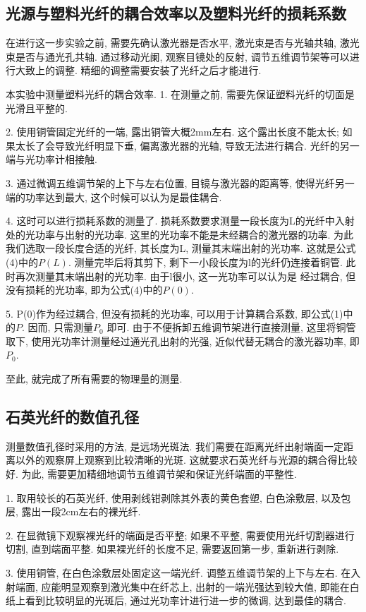 \documentclass[12pt,a4paper]{article}
\begin{document}
\subsection{光源与塑料光纤的耦合效率以及塑料光纤的损耗系数}
在进行这一步实验之前, 需要先确认激光器是否水平, 激光束是否与光轴共轴, 激光束是否与通光孔共轴. 
通过移动光阑, 观察目镜处的反射, 调节五维调节架等可以进行大致上的调整. 精细的调整需要安装了光纤之后才能进行.

本实验中测量塑料光纤的耦合效率. 
1. 在测量之前, 需要先保证塑料光纤的切面是光滑且平整的. 

2. 使用铜管固定光纤的一端, 露出铜管大概2mm左右. 这个露出长度不能太长; 如果太长了会导致光纤明显下垂, 偏离激光器的光轴, 导致无法进行耦合.
光纤的另一端与光功率计相接触.

3. 通过微调五维调节架的上下与左右位置, 目镜与激光器的距离等, 使得光纤另一端的功率达到最大, 这个时候可以认为是最佳耦合.

4. 这时可以进行损耗系数的测量了. 损耗系数要求测量一段长度为L的光纤中入射处的光功率与出射的光功率. 这里的光功率不能是未经耦合的激光器的功率. 
为此我们选取一段长度合适的光纤, 其长度为L, 测量其末端出射的光功率. 这就是公式(4)中的$P(L)$. 测量完毕后将其剪下, 剩下一小段长度为l的光纤仍连接着铜管. 此时再次测量其末端出射的光功率. 由于l很小, 这一光功率可以认为是
经过耦合, 但没有损耗的光功率, 即为公式(4)中的$P(0)$.

5. P(0)作为经过耦合, 但没有损耗的光功率, 可以用于计算耦合系数, 即公式(1)中的$P$. 因而, 只需测量$P_{0}$
即可. 由于不便拆卸五维调节架进行直接测量, 这里将铜管取下, 使用光功率计测量经过通光孔出射的光强, 近似代替无耦合的激光器功率, 即$P_{0}$.

至此, 就完成了所有需要的物理量的测量. 

\subsection{石英光纤的数值孔径}
测量数值孔径时采用的方法, 是远场光斑法. 我们需要在距离光纤出射端面一定距离以外的观察屏上观察到比较清晰的光斑. 这就要求石英光纤与光源的耦合得比较好. 
为此, 需要更加精细地调节五维调节架和保证光纤端面的平整性. 

1. 取用较长的石英光纤, 使用剥线钳剥除其外表的黄色套塑, 白色涂敷层, 以及包层, 露出一段2cm左右的裸光纤. 

2. 在显微镜下观察裸光纤的端面是否平整; 如果不平整, 需要使用光纤切割器进行切割, 直到端面平整. 如果裸光纤的长度不足, 需要返回第一步, 重新进行剥除. 

3. 使用铜管, 在白色涂敷层处固定这一端光纤. 调整五维调节架的上下与左右. 在入射端面, 应能明显观察到激光集中在纤芯上, 出射的一端光强达到较大值, 即能在白纸上看到比较明显的光斑后, 
通过光功率计进行进一步的微调, 达到最佳的耦合. 
\end{document}
